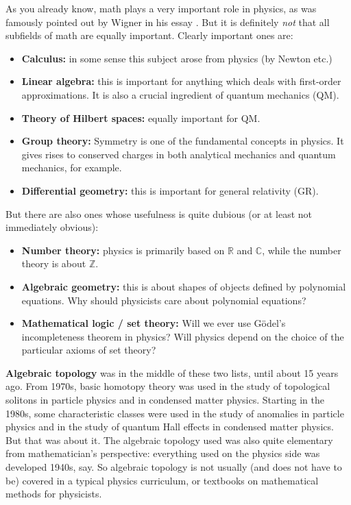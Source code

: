 \documentclass[12pt]{article}
\numberwithin{equation}{section}
\numberwithin{figure}{section}
\theoremstyle{remark}
\def\bC{\mathbb{C}}
\def\bR{\mathbb{R}}
\def\bZ{\mathbb{Z}}
\begin{document}
As you already know, math plays a very important role in physics, 
as was famously pointed out by Wigner in his essay \cite{WignerUnreasonable}.
But it is definitely \emph{not} that all subfields of math are equally important.
Clearly important ones are:
\begin{itemize}
  \item \textbf{Calculus:} in some sense this subject arose from physics (by Newton etc.)
  \item \textbf{Linear algebra:} this is important for anything which deals with first-order approximations. 
  It is also a crucial ingredient of quantum mechanics (QM).
  \item \textbf{Theory of Hilbert spaces:} equally important for QM.
  \item \textbf{Group theory:} Symmetry is one of the fundamental concepts in physics. It gives rises to conserved charges in both analytical mechanics and quantum mechanics, for example.
  \item \textbf{Differential geometry:} this is important for general relativity (GR).
\end{itemize}

But there are also ones whose usefulness is quite dubious (or at least not immediately obvious):
\begin{itemize}
  \item \textbf{Number theory:} physics is primarily based on $\bR$ and $\bC$, 
  while the number theory is about $\bZ$.
  \item \textbf{Algebraic geometry:} this is about shapes of objects defined by polynomial equations. 
  Why should physicists care about polynomial equations?
  \item \textbf{Mathematical logic / set theory:} Will we ever use G\"odel's incompleteness theorem in physics?
  Will physics depend on the choice of the particular axioms of set theory?
\end{itemize}

\textbf{Algebraic topology} was in the middle of these two lists, until about 15 years ago.
From 1970s, basic homotopy theory was used in the study of topological solitons 
in particle physics and in condensed matter physics.
Starting in the 1980s, 
some characteristic classes were used in the study of anomalies in particle physics
and in the study of quantum Hall effects in condensed matter physics.
But that was about it.
The algebraic topology used was also quite elementary from mathematician's perspective:
everything used on the physics side was developed 1940s, say.
So  algebraic topology is not usually (and does not have to be) covered in a typical physics curriculum,
or textbooks on mathematical methods for physicists.
\end{document}
